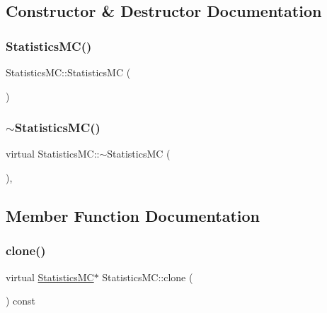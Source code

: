 \subsection{Constructor \& Destructor Documentation}
\hypertarget{classStatisticsMC_ad1b428e0652968ebf00aa0b018a470d2}{}\label{classStatisticsMC_ad1b428e0652968ebf00aa0b018a470d2} 
\subsubsection{\texorpdfstring{Statistics\+M\+C()}{StatisticsMC()}}
{\footnotesize\ttfamily Statistics\+M\+C\+::\+Statistics\+MC (\begin{DoxyParamCaption}{ }\end{DoxyParamCaption})\hspace{0.3cm}{\ttfamily [inline]}}

\hypertarget{classStatisticsMC_aef119bf7e7b60ba4fb8aaaf3605a564d}{}\label{classStatisticsMC_aef119bf7e7b60ba4fb8aaaf3605a564d} 
\subsubsection{\texorpdfstring{$\sim$\+Statistics\+M\+C()}{~StatisticsMC()}}
{\footnotesize\ttfamily virtual Statistics\+M\+C\+::$\sim$\+Statistics\+MC (\begin{DoxyParamCaption}{ }\end{DoxyParamCaption})\hspace{0.3cm}{\ttfamily [inline]}, {\ttfamily [virtual]}}



\subsection{Member Function Documentation}
\hypertarget{classStatisticsMC_af716d17e088d36f283e112ba736f8002}{}\label{classStatisticsMC_af716d17e088d36f283e112ba736f8002} 
\subsubsection{\texorpdfstring{clone()}{clone()}}
{\footnotesize\ttfamily virtual \hyperlink{classStatisticsMC}{Statistics\+MC}$\ast$ Statistics\+M\+C\+::clone (\begin{DoxyParamCaption}{ }\end{DoxyParamCaption}) const\hspace{0.3cm}{\ttfamily [pure virtual]}}



